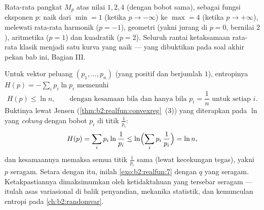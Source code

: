 \begin{omfigure}

{\small Rata-rata pangkat $M_p$ atas nilai $1, 2, 4$ (dengan bobot
sama), sebagai fungsi eksponen $p$: naik dari
$\min = 1$ (ketika $p \to -\infty$) ke $\max = 4$ (ketika $p \to
+\infty$), melewati rata-rata harmonik ($p = -1$), geometri (yakni
jurang di $p = 0$, bernilai $2$), aritmetika ($p = 1$) dan kuadratik ($p
= 2$). Seluruh rantai ketaksamaan rata-rata klasik menjadi
satu kurva yang naik --- yang dibuktikan pada soal akhir pekan bab ini,
Bagian III.}
\end{omfigure}

\begin{example}\label{ex:b2:realfun:entropy}
Untuk vektor peluang $(p_1, \dots, p_n)$ (yang positif dan
berjumlah $1$), entropinya $H(p) = -\sum_i p_i\ln p_i$
memenuhi
\[
H(p) \leq \ln n ,
\qquad\text{dengan kesamaan bila dan hanya bila } p_i = \frac1n \text{ untuk setiap }
i .
\]
Buktinya lewat Jensen (\cref{thm:b2:realfun:convexreg}~(3)) yang
diterapkan pada $\ln$ yang \emph{cekung} dengan bobot $p_i$ di titik
$\frac{1}{p_i}$:
\[
H(p) = \sum_i p_i\ln\frac{1}{p_i}
\leq \ln\Bigl(\sum_i p_i\,\frac1{p_i}\Bigr) = \ln n ,
\]
dan kesamaannya memaksa semua titik $\frac1{p_i}$ sama (lewat
kecekungan tegas), yakni $p$ seragam. Setara dengan itu, inilah
\cref{exo:b2:realfun:7} dengan $q$ yang seragam. Ketakpastiannya
dimaksimumkan oleh ketidaktahuan yang tersebar seragam --- itulah asas
variasional di balik penyandian, mekanika statistik, dan kemunculan
entropi pada \cref{ch:b2:randomvar}.
\end{example}

